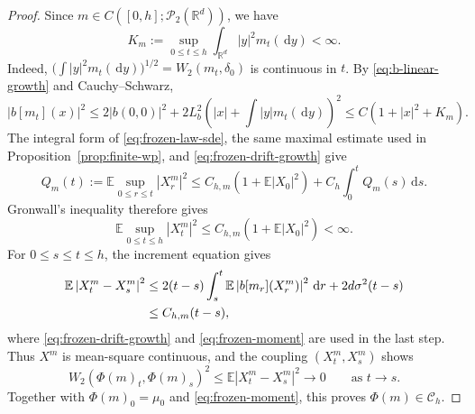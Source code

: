 \documentclass[11pt]{amsart}
\numberwithin{equation}{section}
\theoremstyle{plain}
\newcommand{\R}{\mathbb{R}}
\newcommand{\E}{\mathbb{E}}
\newcommand{\cP}{\mathcal{P}}
\newcommand{\dd}{\,\mathrm{d}}
\newcommand{\abs}[1]{\left\lvert#1\right\rvert}
\begin{document}
\begin{proof}
Since $m\in C([0,h];\cP_2(\R^d))$, we have
\[
 K_m:=\sup_{0\leq t\leq h}
 \int_{\R^d}\abs{y}^2m_t(\dd y)<\infty.
\]
Indeed, 
$\bigl(\int\abs{y}^2m_t(\dd y)\bigr)^{1/2}
=W_2(m_t,\delta_0)$ is continuous in $t$.  By
\eqref{eq:b-linear-growth} and Cauchy--Schwarz,
\begin{equation}\label{eq:frozen-drift-growth}
 \abs{b[m_t](x)}^2 %
 \leq 2\abs{b(0,0)}^2+2L_b^2\left(\abs{x}+\int\abs{y}m_t(\dd y)\right)^2
 \leq C\left(1+\abs{x}^2+K_m\right).
\end{equation}
The integral form of \eqref{eq:frozen-law-sde}, the same maximal estimate used
in Proposition~\ref{prop:finite-wp}, and
\eqref{eq:frozen-drift-growth} give
\[
 Q_m(t):=\E\sup_{0\leq r\leq t}\abs{X_r^m}^2
 \leq C_{h,m}\left(1+\E\abs{X_0}^2\right)
 +C_h\int_0^tQ_m(s)\dd s.
\]
Gronwall's inequality therefore gives
\begin{equation}\label{eq:frozen-moment}
 \E\sup_{0\leq t\leq h}\abs{X_t^m}^2
 \leq C_{h,m}\left(1+\E\abs{X_0}^2\right)<\infty.
\end{equation}
For $0\leq s\leq t\leq h$, the increment equation gives
\begin{align}
 \E\abs{X_t^m-X_s^m}^2
 &\leq 2(t-s)\int_s^t\E\abs{b[m_r](X_r^m)}^2\dd r
      +2d\sigma^2(t-s)\notag\\
 &\leq C_{h,m}(t-s),\label{eq:frozen-ms-continuity}
\end{align}
where \eqref{eq:frozen-drift-growth} and \eqref{eq:frozen-moment} are used in
the last step.  Thus $X^m$ is mean-square continuous, and the coupling
$(X_t^m,X_s^m)$ shows
\[
 W_2(\Phi(m)_t,\Phi(m)_s)^2
 \leq\E\abs{X_t^m-X_s^m}^2\longrightarrow0
 \qquad\text{as }t\to s.
\]
Together with $\Phi(m)_0=\mu_0$ and \eqref{eq:frozen-moment}, this proves
$\Phi(m)\in\mathcal C_h$.


\end{proof}
\end{document}
